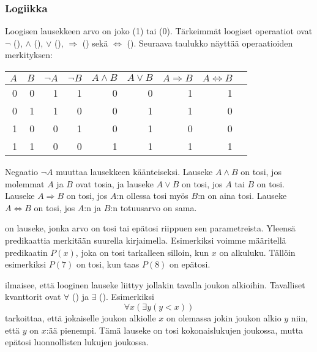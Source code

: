 \subsubsection{Logiikka}


Loogisen lausekkeen arvo on joko  (1) tai
 (0).
Tärkeimmät loogiset operaatiot ovat
$\lnot$ (),
$\land$ (),
$\lor$ (),
$\Rightarrow$ () sekä
$\Leftrightarrow$ ().
Seuraava taulukko näyttää operaatioiden merkityksen:

\begin{center}
\begin{tabular}{rr|rrrrrrr}
$A$ & $B$ & $\lnot A$ & $\lnot B$ & $A \land B$ & $A \lor B$ & $A \Rightarrow B$ & $A \Leftrightarrow B$ \\
\hline
0 & 0 & 1 & 1 & 0 & 0 & 1 & 1 \\
0 & 1 & 1 & 0 & 0 & 1 & 1 & 0 \\
1 & 0 & 0 & 1 & 0 & 1 & 0 & 0 \\
1 & 1 & 0 & 0 & 1 & 1 & 1 & 1 \\
\end{tabular}
\end{center}

Negaatio $\lnot A$ muuttaa lausekkeen käänteiseksi.
Lauseke $A \land B$ on tosi, jos molemmat $A$ ja $B$ ovat tosia,
ja lauseke $A \lor B$ on tosi, jos $A$ tai $B$ on tosi.
Lauseke $A \Rightarrow B$ on tosi,
jos $A$:n ollessa tosi myös $B$:n on aina tosi.
Lauseke $A \Leftrightarrow B$ on tosi,
jos $A$:n ja $B$:n totuusarvo on sama.


 on lauseke, jonka arvo on tosi tai epätosi
riippuen sen parametreista.
Yleensä predikaattia merkitään suurella kirjaimella.
Esimerkiksi voimme määritellä predikaatin $P(x)$,
joka on tosi tarkalleen silloin, kun $x$ on alkuluku.
Tällöin esimerkiksi $P(7)$ on tosi, kun taas $P(8)$ on epätosi.


 ilmaisee, että looginen
lauseke liittyy jollakin tavalla joukon alkioihin.
Tavalliset kvanttorit
ovat $\forall$ () ja $\exists$ ().
Esimerkiksi
\[\forall x (\exists y (y < x))\]
tarkoittaa, että jokaiselle joukon
alkiolle $x$ on olemassa
jokin joukon alkio $y$ niin, että $y$ on $x$:ää pienempi.
Tämä lauseke on tosi kokonaislukujen joukossa,
mutta epätosi luonnollisten lukujen joukossa.

